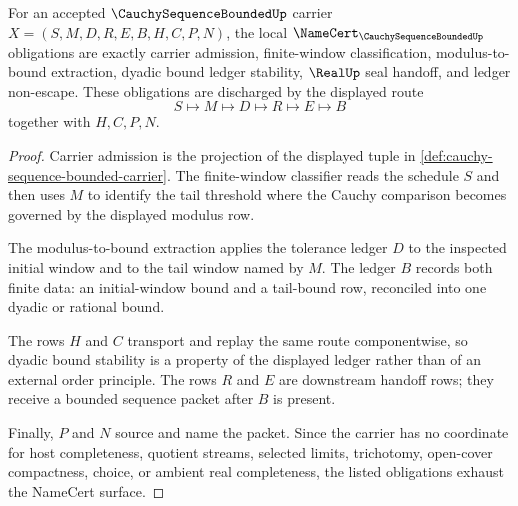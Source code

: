 \begin{theorem}
\label{thm:cauchy-sequence-bounded-namecert-obligations}
For an accepted $\CauchySequenceBoundedUp$ carrier $X=(S,M,D,R,E,B,H,C,P,N)$, the local $\NameCert_{\CauchySequenceBoundedUp}$ obligations are exactly carrier admission, finite-window classification, modulus-to-bound extraction, dyadic bound ledger stability, $\RealUp$ seal handoff, and ledger non-escape. These obligations are discharged by the displayed route
$$
S\longmapsto M\longmapsto D\longmapsto R\longmapsto E\longmapsto B
$$
together with $H,C,P,N$.
\end{theorem}
\begin{proof}
Carrier admission is the projection of the displayed tuple in \autoref{def:cauchy-sequence-bounded-carrier}. The finite-window classifier reads the schedule $S$ and then uses $M$ to identify the tail threshold where the Cauchy comparison becomes governed by the displayed modulus row.

The modulus-to-bound extraction applies the tolerance ledger $D$ to the inspected initial window and to the tail window named by $M$. The ledger $B$ records both finite data: an initial-window bound and a tail-bound row, reconciled into one dyadic or rational bound.

The rows $H$ and $C$ transport and replay the same route componentwise, so dyadic bound stability is a property of the displayed ledger rather than of an external order principle. The rows $R$ and $E$ are downstream handoff rows; they receive a bounded sequence packet after $B$ is present.

Finally, $P$ and $N$ source and name the packet. Since the carrier has no coordinate for host completeness, quotient streams, selected limits, trichotomy, open-cover compactness, choice, or ambient real completeness, the listed obligations exhaust the NameCert surface.
\end{proof}

